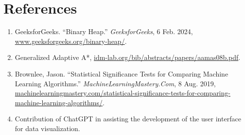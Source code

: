 \graphicspath{{Images/}}

\section{References}
\begin{enumerate}

\item GeeksforGeeks. “Binary Heap.” \emph{GeeksforGeeks}, 6 Feb. 2024, \url{www.geeksforgeeks.org/binary-heap/}.

\item Generalized Adaptive A*, \url{idm-lab.org/bib/abstracts/papers/aamas08b.pdf}.

\item Brownlee, Jason. “Statistical Significance Tests for Comparing Machine Learning Algorithms.” \emph{MachineLearningMastery.Com}, 8 Aug. 2019, \url{machinelearningmastery.com/statistical-significance-tests-for-comparing-machine-learning-algorithms/}.

\item Contribution of ChatGPT in assisting the development of the user interface for data visualization.

\end{enumerate}